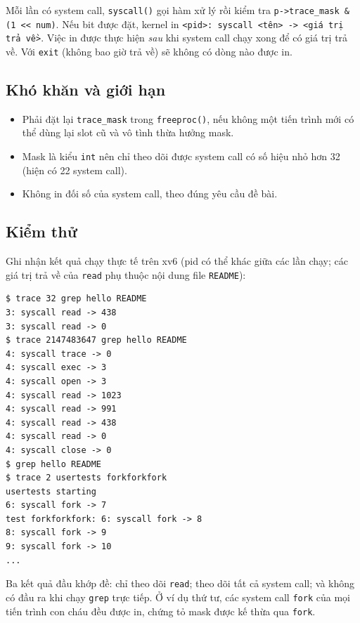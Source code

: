 Mỗi lần có system call, \texttt{syscall()} gọi hàm xử lý rồi kiểm tra \texttt{p->trace\_mask \& (1 << num)}. Nếu bit được đặt, kernel in \texttt{<pid>: syscall <tên> -> <giá trị trả về>}. Việc in được thực hiện \emph{sau} khi system call chạy xong để có giá trị trả về. Với \texttt{exit} (không bao giờ trả về) sẽ không có dòng nào được in.

\subsection{Khó khăn và giới hạn}
\begin{itemize}
  \item Phải đặt lại \texttt{trace\_mask} trong \texttt{freeproc()}, nếu không một tiến trình mới có thể dùng lại slot cũ và vô tình thừa hưởng mask.
  \item Mask là kiểu \texttt{int} nên chỉ theo dõi được system call có số hiệu nhỏ hơn 32 (hiện có 22 system call).
  \item Không in đối số của system call, theo đúng yêu cầu đề bài.
\end{itemize}

\subsection{Kiểm thử}
Ghi nhận kết quả chạy thực tế trên xv6 (pid có thể khác giữa các lần chạy; các giá trị trả về của \texttt{read} phụ thuộc nội dung file \texttt{README}):

\begin{center}
\begin{minipage}{0.86\textwidth}
\begin{lstlisting}[numbers=none,xleftmargin=0pt,framexleftmargin=0pt]
$ trace 32 grep hello README
3: syscall read -> 438
3: syscall read -> 0
$ trace 2147483647 grep hello README
4: syscall trace -> 0
4: syscall exec -> 3
4: syscall open -> 3
4: syscall read -> 1023
4: syscall read -> 991
4: syscall read -> 438
4: syscall read -> 0
4: syscall close -> 0
$ grep hello README
$ trace 2 usertests forkforkfork
usertests starting
6: syscall fork -> 7
test forkforkfork: 6: syscall fork -> 8
8: syscall fork -> 9
9: syscall fork -> 10
...
\end{lstlisting}
\end{minipage}
\end{center}

\noindent Ba kết quả đầu khớp đề: chỉ theo dõi \texttt{read}; theo dõi tất cả system call; và không có đầu ra khi chạy \texttt{grep} trực tiếp. Ở ví dụ thứ tư, các system call \texttt{fork} của mọi tiến trình con cháu đều được in, chứng tỏ mask được kế thừa qua \texttt{fork}.
